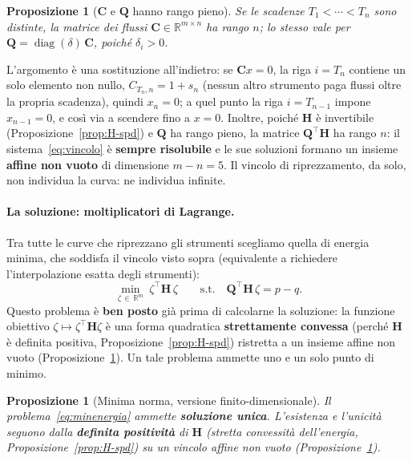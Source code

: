 \documentclass[11pt,a4paper]{article}
\theoremstyle{plain}
\newtheorem{proposizione}[teorema]{Proposizione}
\theoremstyle{definition}
\theoremstyle{remark}
\newcommand{\Qmat}{\mathbf{Q}}
\newcommand{\Hmat}{\mathbf{H}}
\newcommand{\transp}{^{\!\top}}
\begin{document}
\begin{proposizione}[$\mathbf{C}$ e $\Qmat$ hanno rango pieno]
\label{prop:rango}
Se le scadenze $T_1<\cdots<T_n$ sono distinte, la matrice dei flussi
$\mathbf{C}\in\mathbb{R}^{m\times n}$ ha rango $n$; lo stesso vale per
$\Qmat=\operatorname{diag}(\delta)\,\mathbf{C}$, poich\'e $\delta_i>0$.
\end{proposizione}

L'argomento \`e una sostituzione all'indietro: se $\mathbf{C}x=0$, la riga $i=T_n$ contiene
un solo elemento non nullo, $C_{T_n,n}=1+s_n$ (nessun altro strumento paga flussi oltre la
propria scadenza), quindi $x_n=0$; a quel punto la riga $i=T_{n-1}$ impone $x_{n-1}=0$, e
cos\`i via a scendere fino a $x=0$. Inoltre, poich\'e $\Hmat$ \`e invertibile
(Proposizione~\ref{prop:H-spd}) e $\Qmat$ ha rango pieno, la matrice $\Qmat\transp\Hmat$ ha
rango $n$: il sistema~\eqref{eq:vincolo} \`e \textbf{sempre risolubile} e le sue soluzioni
formano un insieme \textbf{affine non vuoto} di dimensione $m-n=5$. Il vincolo di
riprezzamento, da solo, non individua la curva: ne individua infinite.

\paragraph{La soluzione: moltiplicatori di Lagrange.}
Tra tutte le curve che riprezzano gli strumenti scegliamo quella di energia minima, che soddisfa
il vincolo visto sopra (equivalente a richiedere l'interpolazione esatta degli strumenti):
\begin{equation}
  \min_{\zeta\,\in\,\mathbb{R}^m} \ \zeta\transp \Hmat\, \zeta
  \qquad \text{s.t.}\quad
  \Qmat\transp \Hmat\, \zeta = p - q .
  \label{eq:minenergia}
\end{equation}
Questo problema \`e \textbf{ben posto} gi\`a prima di calcolarne la soluzione: la funzione
obiettivo $\zeta\mapsto\zeta\transp\Hmat\zeta$ \`e una forma quadratica
\textbf{strettamente convessa} (perch\'e $\Hmat$ \`e definita positiva,
Proposizione~\ref{prop:H-spd}) ristretta a un insieme affine non vuoto
(Proposizione~\ref{prop:rango}). Un tale problema ammette uno e un solo punto di minimo.

\begin{proposizione}[Minima norma, versione finito-dimensionale]
\label{prop:minnorm-finita}
Il problema~\eqref{eq:minenergia} ammette \textbf{soluzione unica}. L'esistenza e
l'unicit\`a seguono dalla \textbf{definita positivit\`a} di $\Hmat$ (stretta
convessit\`a dell'energia, Proposizione~\ref{prop:H-spd}) su un vincolo affine non vuoto
(Proposizione~\ref{prop:rango}).
\end{proposizione}
\end{document}
